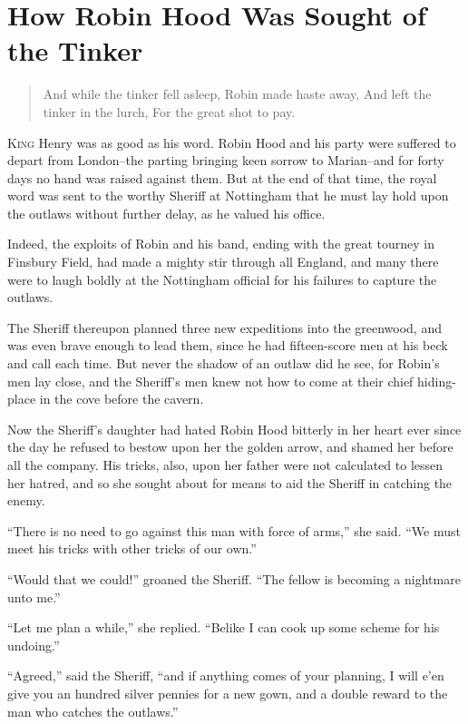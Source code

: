 \chapter{How Robin Hood Was Sought of the Tinker}

\begin{quote}
And while the tinker fell asleep,
Robin made haste away,
And left the tinker in the lurch,
For the great shot to pay.
\end{quote}

\lettrine{K}{ing} Henry was as good as his word. Robin Hood and his party were
suffered to depart from London--the parting bringing keen sorrow to
Marian--and for forty days no hand was raised against them. But at the
end of that time, the royal word was sent to the worthy Sheriff at
Nottingham that he must lay hold upon the outlaws without further delay,
as he valued his office.

Indeed, the exploits of Robin and his band, ending with the great
tourney in Finsbury Field, had made a mighty stir through all England,
and many there were to laugh boldly at the Nottingham official for his
failures to capture the outlaws.

The Sheriff thereupon planned three new expeditions into the greenwood,
and was even brave enough to lead them, since he had fifteen-score men
at his beck and call each time. But never the shadow of an outlaw did he
see, for Robin's men lay close, and the Sheriff's men knew not how to
come at their chief hiding-place in the cove before the cavern.

Now the Sheriff's daughter had hated Robin Hood bitterly in her heart
ever since the day he refused to bestow upon her the golden arrow, and
shamed her before all the company. His tricks, also, upon her father
were not calculated to lessen her hatred, and so she sought about for
means to aid the Sheriff in catching the enemy.

``There is no need to go against this man with force of arms,'' she
said. ``We must meet his tricks with other tricks of our own.''

``Would that we could!'' groaned the Sheriff. ``The fellow is becoming a
nightmare unto me.''

``Let me plan a while,'' she replied. ``Belike I can cook up some scheme
for his undoing.''

``Agreed,'' said the Sheriff, ``and if anything comes of your planning,
I will e'en give you an hundred silver pennies for a new gown, and a
double reward to the man who catches the outlaws.''

